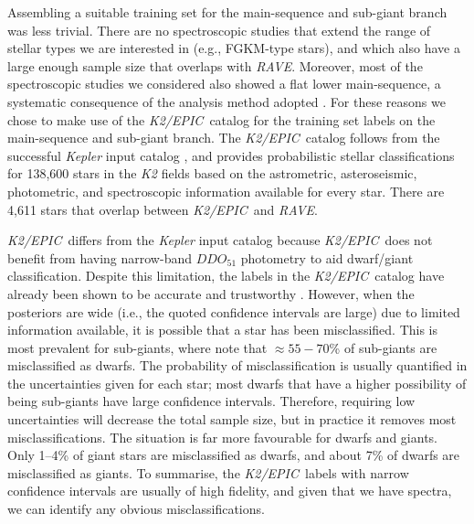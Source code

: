 \documentclass[preprint]{aastex61}
\newcommand{\acronym}[1]{{\small{#1}}}
\newcommand{\project}[1]{\textsl{#1}}
\newcommand{\rave}{\project{\acronym{RAVE}}}
\newcommand{\epic}{\project{K2/EPIC}}
\begin{document}
Assembling a suitable training set for the main-sequence and sub-giant branch was less
trivial.  There are no spectroscopic studies that extend the range of stellar types we 
are interested in (e.g., FGKM-type stars), and which also have a large enough sample size 
that overlaps with \rave.  Moreover, most of the spectroscopic studies we considered also 
showed a flat lower main-sequence, a systematic consequence of the analysis method adopted 
\citep[see][for discussion on this issue]{Bensby_2014}.  For these reasons we chose to make 
use of the \epic\ catalog \citep{Huber_2016} for the training set labels on the 
main-sequence and sub-giant branch.  The \epic\ catalog follows from the successful
\project{Kepler} input catalog \citep{Brown_2011}, and provides probabilistic stellar 
classifications for 138,600 stars in the \project{K2} fields based on the 
astrometric, asteroseismic, photometric, and spectroscopic information available for
every star.  There are 4,611 stars that overlap between \epic\ and \rave.


\epic\ differs from the \project{Kepler} input catalog because \epic\ does not 
benefit from having narrow-band $DDO_{51}$ photometry to aid dwarf/giant 
classification.  Despite this limitation, the labels in the \epic\ catalog have 
already been shown to be accurate and trustworthy \citep{Huber_2016}.  However, 
when the posteriors are wide (i.e., the quoted confidence intervals are large) 
due to limited information available, it is possible that a star has been 
misclassified.  This is most prevalent for sub-giants, where \citet{Huber_2016} 
note that $\approx55-70$\% of sub-giants are misclassified as dwarfs.  The 
probability of misclassification is usually quantified in the uncertainties given
for each star; most dwarfs that have a higher possibility of being sub-giants have
large confidence intervals.  Therefore, requiring low uncertainties will decrease 
the total sample size, but in practice it removes most misclassifications.  The 
situation is far more favourable for dwarfs and giants.  Only 1--4\% of giant 
stars are misclassified as dwarfs, and about 7\% of dwarfs are misclassified as 
giants.  To summarise, the \epic\ labels with narrow confidence intervals are 
usually of high fidelity, and given that we have spectra, we can identify any
obvious misclassifications.
\end{document}
